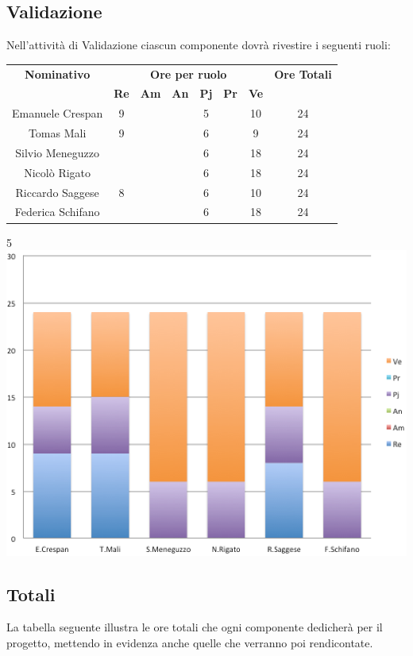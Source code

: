 \subsection{Validazione}
Nell'attività di Validazione ciascun componente dovrà rivestire i seguenti ruoli:
\begin{center}
  \centering
  \begin{tabular} {|c|c|c|c|c|c|c|c|}
    \hline
    \textbf{Nominativo} & \multicolumn{6}{|c|}{\textbf{Ore per ruolo}} & \textbf{Ore Totali} \\
    & \textbf{Re} & \textbf{Am} & \textbf{An} & \textbf{Pj} & \textbf{Pr} & \textbf{Ve} & \\
    \hline
    Emanuele Crespan &9 & & &5 & &10 &24\\
    \hline
    Tomas Mali &9 & & & 6& &9 &24\\
    \hline
    Silvio Meneguzzo & & & &6 & &18 &24\\
    \hline
    Nicolò Rigato & & & &6 & &18 &24\\
    \hline
    Riccardo Saggese &8 & & &6 & &10 &24\\
    \hline
    Federica Schifano & & & &6 & &18 &24\\
    \hline
  \end{tabular}
  5\includegraphics[scale=0.65]{img/fig6.png}
\end{center}

\subsection{Totali}
La tabella seguente illustra le ore totali che ogni componente dedicherà per il progetto, mettendo in evidenza anche quelle che verranno poi rendicontate.\\ \\


